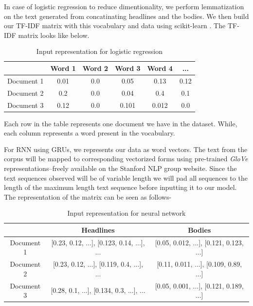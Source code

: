 \documentclass[11.5pt]{article}
\begin{document}
 
In case of logistic regression to reduce dimentionality, we perform lemmatization on the text generated from concatinating headlines and the bodies. 
We then build our TF-IDF matrix with this vocabulary and data using scikit-learn \cite{scikit-learn}. The TF-IDF matrix looks like below.

\begin{table}[h]
  \centering
  \begin{tabular} 
    {|c|c|c|c|c|c|}
    \hline
    & Word 1 & Word 2 & Word 3 & Word 4 & ... \\
    \hline
    Document 1 & 0.01 & 0.0 & 0.05 & 0.13 & 0.12 \\
    \hline
    Document 2 & 0.2 & 0.0 & 0.04 & 0.4 & 0.1 \\
    \hline
    Document 3  & 0.12 & 0.0 & 0.101 & 0.012 & 0.0 \\
    \hline
  \end{tabular}
  \caption{Input representation for logistic regression}
\end{table}

Each row in the table represents one document we have in the dataset. While, each column represents a word present in the vocabulary.

For RNN using GRUs, we represents our data as word vectors. The text from the corpus will be mapped to corresponding vectorized
forms using  pre-trained \textit{GloVe} 
representations--freely available on the Stanford NLP group website\cite{Bird:2009:NLP:1717171,pennington2014glove}. 
Since the text sequences observed will be of variable length we will pad all 
sequences to the length of the maximum length text sequence before inputting 
it to our model. The representation of the matrix can be seen as follows-

\begin{table}[h]
  \centering
  \begin{tabular} 
    {|c|c|c|}
    \hline
    & Headlines & Bodies \\
    \hline
    Document 1 & [0.23, 0.12, ...], [0.123, 0.14, ...], ... & [0.05, 0.012, ...], [0.121, 0.123, ...] \\
    \hline
    Document 2 & [0.23, 0.12, ...], [0.119, 0.4, ...], ... & [0.11, 0.011, ...], [0.109, 0.89, ...] \\
    \hline
    Document 3 & [0.28, 0.1, ...], [0.134, 0.3, ...], ... & [0.05, 0.001, ...], [0.121, 0.189, ...] \\
    \hline
  \end{tabular}
  \caption{Input representation for neural network}
\end{table}
\end{document}
